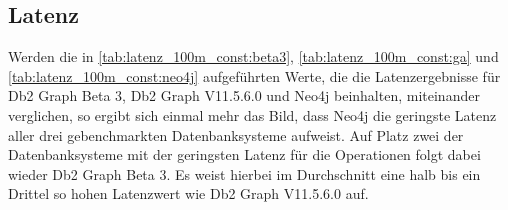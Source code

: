 \subsection{Latenz}
Werden die in \autoref{tab:latenz_100m_const:beta3}, \autoref{tab:latenz_100m_const:ga} und \autoref{tab:latenz_100m_const:neo4j} aufgeführten Werte, die die Latenzergebnisse für Db2 Graph Beta 3, Db2 Graph V11.5.6.0 und Neo4j beinhalten, miteinander verglichen, so ergibt sich einmal mehr das Bild, dass Neo4j die geringste Latenz aller drei gebenchmarkten Datenbanksysteme aufweist. Auf Platz zwei der Datenbanksysteme mit der geringsten Latenz für die Operationen folgt dabei wieder Db2 Graph Beta 3. Es weist hierbei im Durchschnitt eine halb bis ein Drittel so hohen Latenzwert wie Db2 Graph V11.5.6.0 auf.

\begin{table}[!ht]
\centering
{}
\caption{Latenz Linkbench-100M-Const Db2 Graph Beta 3}
\label{tab:latenz_100m_const:beta3}
\end{table}

